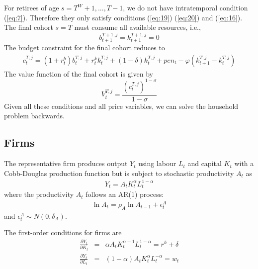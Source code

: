 \documentclass[12pt]{article}
\begin{document}
For retirees of age $s=T^W+1,...,T-1$, we do not have intratemporal condition (\ref{eq:7}). Therefore they only satisfy conditions (\ref{eq:19}) (\ref{eq:20}) and (\ref{eq:16}). The final cohort $s=T$ must consume all available resources, i.e., 
\begin{equation*}
b_{t+1}^{T+1,j} = k_{t+1}^{T+1,j} =0
\end{equation*}
The budget constraint for the final cohort reduces to
\begin{equation}
\begin{split}	
c_{t}^{T,j}=(1+r_t^b)b_{t}^{T,j}+r_t^k k_{t}^{T,j}+(1-\delta)k_{t}^{T,j}+pen_t-\varphi(k_{t+1}^{T,j}-k_{t}^{T,j}) \label{eq:18}
\end{split}
\end{equation}
The value function of the final cohort is given by 
\begin{equation}
V_t^{T,j} = \frac{(c_{t}^{T,j})^{1-\sigma}}{1-\sigma}
\end{equation}
Given all these conditions and all price variables, we can solve the household problem backwards. 


\subsection{Firms}
The representative firm produces output $Y_t$ using labour $L_t$ and capital $K_t$ with a Cobb-Douglas production function but is subject to stochastic productivity $A_t$ as
\begin{eqnarray}
Y_t=A_tK_t^\alpha L_t^{1-\alpha} \label{eq:10}
\end{eqnarray}
where the productivity $A_t$ follows an AR(1) process: 
\begin{eqnarray}
\ln A_t=\rho_A \ln A_{t-1}+\epsilon^A_t \label{eq:11}
\end{eqnarray}
and $\epsilon^A_t \sim N(0,\delta_A)$.

The first-order conditions for firms are 
\begin{eqnarray}
\frac{\partial Y_t}{\partial K_t} &=& \alpha A_tK_t^{\alpha-1}L_t^{1-\alpha} = r^k+\delta \label{eq:12}\\
\frac{\partial Y_t}{\partial L_t} &=& (1-\alpha)A_tK_t^{\alpha}L_t^{-\alpha} = w_t \label{eq:13}
\end{eqnarray}
\end{document}
